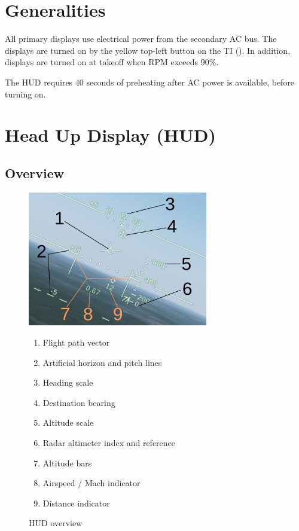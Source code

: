 \section{Generalities}
All primary displays use electrical power from the secondary AC bus.
The displays are turned on by the yellow top-left button on the TI
().
In addition, displays are turned on at takeoff when RPM exceeds 90\%.

The HUD requires 40 seconds of preheating after AC power is available, before turning on.

\section{Head Up Display (HUD)}
\subsection{Overview}
\begin{figure}[!ht]
  \centering
  \includegraphics[width=0.7\textwidth]{images/displays/ja-hud-general.png}

  \begin{multicols}{2}
    \begin{enumerate}[nosep]
      \item \label{item:fpv-hud} Flight path vector
      \item \label{item:horizon-hud} Artificial horizon and pitch lines
      \item \label{item:heading-hud} Heading scale
      \item \label{item:dest} Destination bearing
      \item \label{item:altitude} Altitude scale
      \item \label{item:rhm} Radar altimeter index and reference
      \item \label{item:altbars} Altitude bars
      \item \label{item:speed} Airspeed / Mach indicator
      \item \label{item:distance} Distance indicator
    \end{enumerate}
  \end{multicols}

  \caption{HUD overview}
  \label{fig:hud}
\end{figure}

